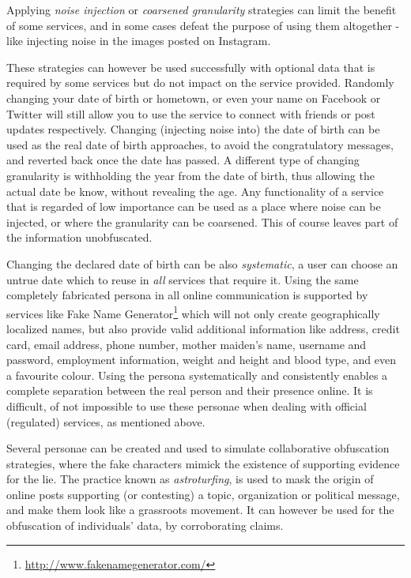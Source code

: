 \documentclass{IOS-Book-Article}     %
\begin{document}
Applying \emph{noise injection} or \emph{coarsened granularity} strategies can 
limit the benefit of some services, and in some cases defeat the purpose of 
using them altogether - like injecting noise in the images posted on Instagram.

These strategies can however be used successfully with optional data that 
is required by some services but do not impact on the service provided. 
Randomly changing your date of birth or hometown, or even your name on Facebook 
or Twitter will still allow you to use the service to connect with friends or 
post updates respectively. Changing (injecting noise into) the date of birth 
can be used as the real date of birth approaches, to avoid the 
congratulatory messages, and reverted back once the date has passed. A 
different type of changing granularity is withholding the year from the 
date of birth, thus allowing the actual date be know, without revealing the 
age. Any functionality of a service that is regarded of low importance can be 
used as a place where noise can be injected, or where the granularity can be 
coarsened. This of course leaves part of the information unobfuscated. 

Changing the declared date of birth can be also \emph{systematic}, a user can 
choose an untrue date which to reuse in \emph{all} services that require it. 
Using the same completely fabricated persona in all online communication is 
supported by services like Fake Name 
Generator\footnote{\url{http://www.fakenamegenerator.com/}} which will not only 
create geographically localized names, but also provide valid additional 
information like address, credit card, email address, phone number, mother 
maiden's name, username and password, employment information, weight and height 
and blood type, and even a favourite colour. Using the persona systematically 
and consistently enables a complete separation between the real person and their 
presence online. It is difficult, of not impossible to use these personae when 
dealing with official (regulated) services, as mentioned above.

Several personae can be created and used to simulate collaborative obfuscation 
strategies, where the fake characters mimick the existence of supporting 
evidence for the lie. The practice known as \emph{astroturfing}, is used to mask the origin of online 
posts supporting (or contesting) a topic, organization or political message, 
and make them look like a grassroots movement. It can however be used for the obfuscation of individuals' data, by corroborating claims.
\end{document}
